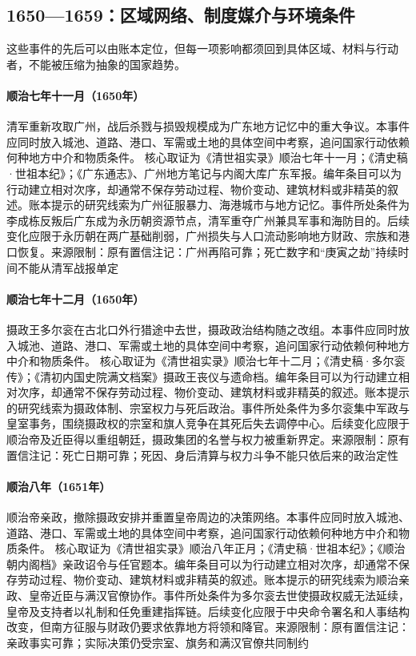 \subsection{1650—1659：区域网络、制度媒介与环境条件}
这些事件的先后可以由账本定位，但每一项影响都须回到具体区域、材料与行动者，不能被压缩为抽象的国家趋势。
\hypertarget{civic:EQ-1650-GUANGZHOU}{}\paragraph{顺治七年十一月（1650年）}清军重新攻取广州，战后杀戮与损毁规模成为广东地方记忆中的重大争议。本事件应同时放入城池、道路、港口、军需或土地的具体空间中考察，追问国家行动依赖何种地方中介和物质条件。 核心取证为《清世祖实录》顺治七年十一月；《清史稿·世祖本纪》；《广东通志》、广州地方笔记与内阁大库广东军报。编年条目可以为行动建立相对次序，却通常不保存劳动过程、物价变动、建筑材料或非精英的叙述。账本提示的研究线索为广州征服暴力、海港城市与地方记忆。事件所处条件为李成栋反叛后广东成为永历朝资源节点，清军重夺广州兼具军事和海防目的。后续变化应限于永历朝在两广基础削弱，广州损失与人口流动影响地方财政、宗族和港口恢复。来源限制：原有置信注记：广州再陷可靠；死亡数字和“庚寅之劫”持续时间不能从清军战报单定
\hypertarget{civic:EQ-1650-DORGON-DEATH}{}\paragraph{顺治七年十二月（1650年）}摄政王多尔衮在古北口外行猎途中去世，摄政政治结构随之改组。本事件应同时放入城池、道路、港口、军需或土地的具体空间中考察，追问国家行动依赖何种地方中介和物质条件。 核心取证为《清世祖实录》顺治七年十二月；《清史稿·多尔衮传》；《清初内国史院满文档案》摄政王丧仪与遗命档。编年条目可以为行动建立相对次序，却通常不保存劳动过程、物价变动、建筑材料或非精英的叙述。账本提示的研究线索为摄政体制、宗室权力与死后政治。事件所处条件为多尔衮集中军政与皇室事务，围绕摄政权的宗室和旗人竞争在其死后失去调停中心。后续变化应限于顺治帝及近臣得以重组朝廷，摄政集团的名誉与权力被重新界定。来源限制：原有置信注记：死亡日期可靠；死因、身后清算与权力斗争不能只依后来的政治定性
\hypertarget{civic:EQ-1651-SHUNZHI-PERSONAL-RULE}{}\paragraph{顺治八年（1651年）}顺治帝亲政，撤除摄政安排并重置皇帝周边的决策网络。本事件应同时放入城池、道路、港口、军需或土地的具体空间中考察，追问国家行动依赖何种地方中介和物质条件。 核心取证为《清世祖实录》顺治八年正月；《清史稿·世祖本纪》；《顺治朝内阁档》亲政诏令与任官题本。编年条目可以为行动建立相对次序，却通常不保存劳动过程、物价变动、建筑材料或非精英的叙述。账本提示的研究线索为顺治亲政、皇帝近臣与满汉官僚协作。事件所处条件为多尔衮去世使摄政权威无法延续，皇帝及支持者以礼制和任免重建指挥链。后续变化应限于中央命令署名和人事结构改变，但南方征服与财政仍要求依靠地方将领和降官。来源限制：原有置信注记：亲政事实可靠；实际决策仍受宗室、旗务和满汉官僚共同制约
